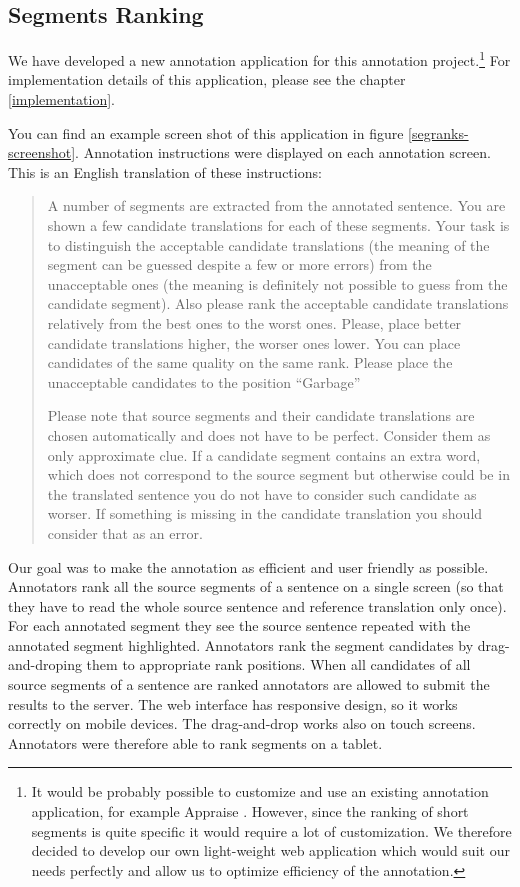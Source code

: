 \subsection{Segments Ranking}

We have developed a new annotation application for this annotation
project.\footnote{It would be probably possible to customize and use an
    existing annotation application, for example Appraise
    .  However, since the ranking of short segments is
    quite specific it would require a lot of customization. We therefore
decided to develop our own light-weight web application which would suit our
needs perfectly and allow us to optimize efficiency of the annotation.} For
implementation details of this application, please see the chapter
\ref{implementation}.

You can find an example screen shot of this application in figure
\ref{segranks-screenshot}. Annotation instructions were displayed on each
annotation screen. This is an English translation of these instructions:

\begin{quote}
A number of segments are extracted from the annotated sentence. You are shown a
few candidate translations for each of these segments. Your task is to
distinguish the acceptable candidate translations (the meaning of the segment
can be guessed despite a few or more errors) from the unacceptable ones (the
meaning is definitely not possible to guess from the candidate segment). Also
please rank the acceptable candidate translations relatively from the best ones
to the worst ones.  Please, place better candidate translations higher, the
worser ones lower. You can place candidates of the same quality on the same
rank. Please place the unacceptable candidates to the position ``Garbage''

Please note that source segments and their candidate translations are chosen
automatically and does not have to be perfect. Consider them as only
approximate clue. If a candidate segment contains an extra word, which does not
correspond to the source segment but otherwise could be in the translated
sentence you do not have to consider such candidate as worser. If something is
missing in the candidate translation you should consider that as an error.
\end{quote}

Our goal was to make the annotation as efficient and user friendly as possible.
Annotators rank all the source segments of a sentence on a single screen (so
that they have to read the whole source sentence and reference translation only
once). For each annotated segment they see the source sentence repeated with
the annotated segment highlighted. Annotators rank the segment candidates by
drag-and-droping them to appropriate rank positions. When all candidates of all
source segments of a sentence are ranked annotators are allowed to submit the
results to the server.  The web interface has responsive design, so it works
correctly on mobile devices.  The drag-and-drop works also on touch screens.
Annotators were therefore able to rank segments on a tablet.

